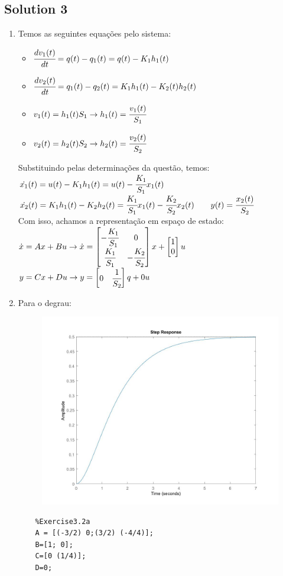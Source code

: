 \documentclass[a4paper,11pt]{article}
\begin{document}
\subsection*{Solution 3}
\begin{enumerate}
	\item Temos as seguintes equa\c{c}\~{o}es pelo sistema:
	\begin{itemize}
		\item $\cfrac{dv_1(t)}{dt}=q(t)-q_1(t)=q(t)-K_1h_1(t)$
		\item $\cfrac{dv_2(t)}{dt}=q_1(t)-q_2(t)=K_1h_1(t)-K_2(t)h_2(t) $
		\item $v_1(t)=h_1(t)S_1\rightarrow h_1(t)=\cfrac{v_1(t)}{S_1} $
		\item $v_2(t)=h_2(t)S_2\rightarrow h_2(t)=\cfrac{v_2(t)}{S_2} $
	\end{itemize}
	Substituindo pelas determina\c{c}\~{o}es da quest\~{a}o, temos:
	\\$\dot{x_1}(t)=u(t) -K_1h_1(t)=u(t)-\cfrac{K_1}{S_1}x_1(t) $
	\\$\dot{x_2}(t)=K_1h_1(t)-K_2h_2(t)=
	\cfrac{K_1}{S_1}x_1(t)-	\cfrac{K_2}{S_2}x_2(t)
	\qquad y(t)=\cfrac{x_2(t)}{S_2}$
	\\Com isso, achamos a representa\c{c}\~{a}o em espa\c{c}o de estado:
	\\$\dot{x}=Ax+Bu\rightarrow\dot{x}=
	\begin{bmatrix}
	-\cfrac{K_1}{S_1} & 0\\
	\cfrac{K_1}{S_1} & -\cfrac{K_2}{S_2}
	\end{bmatrix}x+
	\begin{bmatrix}
	1\\
	0
	\end{bmatrix}u$
	\vskip0.4cm
	$y=Cx+Du\rightarrow y=
	\begin{bmatrix}
	0 & \cfrac{1}{S_2}
	\end{bmatrix}q+0u$
	\item Para o degrau:
	\begin{figure}[!h]  \includegraphics [scale=0.4] {Figures/e32step} \end{figure}
	\begin{lstlisting}
	%Exercise3.2a
	A = [(-3/2) 0;(3/2) (-4/4)];
	B=[1; 0];
	C=[0 (1/4)];
	D=0;
	

\end{lstlisting}
\end{enumerate}
\end{document}
